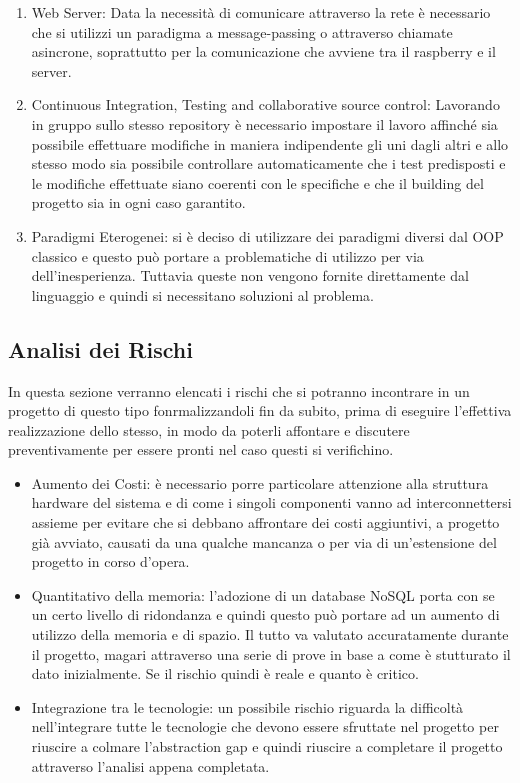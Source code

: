 \begin{enumerate}
  \item Web Server: Data la necessit\`a di comunicare attraverso la rete \`e necessario che si utilizzi un paradigma a message-passing o attraverso chiamate asincrone, soprattutto per la comunicazione che avviene tra il raspberry e il server.
  \item Continuous Integration, Testing and collaborative source control: Lavorando in gruppo sullo stesso repository \`e necessario impostare il lavoro affinch\'e sia possibile effettuare modifiche in maniera indipendente gli uni dagli altri e allo stesso modo sia possibile controllare automaticamente che i test predisposti e le modifiche effettuate siano coerenti con le specifiche e che il building del progetto sia in ogni caso garantito.
  \item{Paradigmi Eterogenei}: si \`e deciso di utilizzare dei paradigmi diversi dal OOP classico e questo pu\`o portare a problematiche di utilizzo per via dell'inesperienza. Tuttavia queste non vengono fornite direttamente dal linguaggio e quindi si necessitano soluzioni al problema.
\end{enumerate}

\subsection{Analisi dei Rischi}

In questa sezione verranno elencati i rischi che si potranno incontrare in un progetto di questo tipo fonrmalizzandoli fin da subito, prima di eseguire l'effettiva realizzazione dello stesso, in modo da poterli affontare e discutere preventivamente per essere pronti nel caso questi si verifichino.

\begin{itemize}
  \item Aumento dei Costi: \`e necessario porre particolare attenzione alla struttura hardware del sistema e di come i singoli componenti vanno ad interconnettersi assieme per evitare che si debbano affrontare dei costi aggiuntivi, a progetto gi\`a avviato, causati da una qualche mancanza o per via di un'estensione del progetto in corso d'opera.
  \item Quantitativo della memoria: l'adozione di un database NoSQL porta con se un certo livello di ridondanza e quindi questo pu\`o portare ad un aumento di utilizzo della memoria e di spazio. Il tutto va valutato accuratamente durante il progetto, magari attraverso una serie di prove in base a come \`e stutturato il dato inizialmente. Se il rischio quindi \`e reale e quanto \`e critico.
  \item Integrazione tra le tecnologie: un possibile rischio riguarda la difficolt\`a nell'integrare tutte le tecnologie che devono essere sfruttate nel progetto per riuscire a colmare l'abstraction gap e quindi riuscire a completare il progetto attraverso l'analisi appena completata.
\end{itemize}
